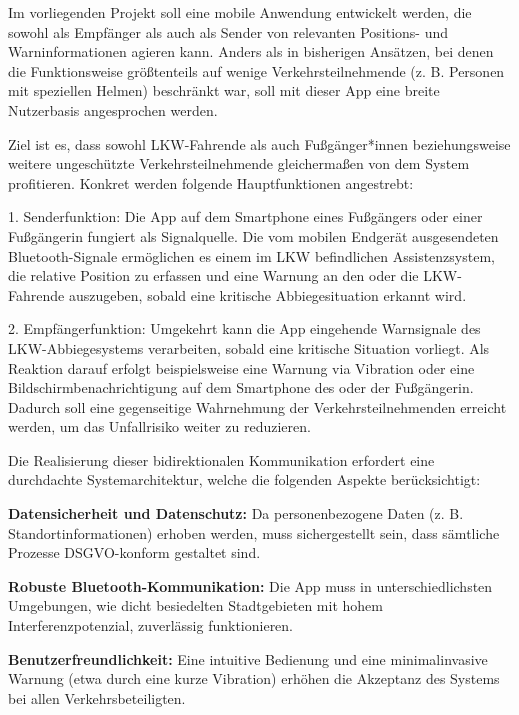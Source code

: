 \documentclass[a4paper, 12pt]{article} %
\begin{document}
\begin{spacing}{1.8}  %
\fontsize{14pt}{15pt}\selectfont  %

 
Im vorliegenden Projekt soll eine mobile Anwendung entwickelt werden, die sowohl als Empfänger als auch als Sender von relevanten Positions- und Warninformationen agieren kann. Anders als in bisherigen Ansätzen, bei denen die Funktionsweise größtenteils auf wenige Verkehrsteilnehmende (z. B. Personen mit speziellen Helmen) beschränkt war, soll mit dieser App eine breite Nutzerbasis angesprochen werden.  

Ziel ist es, dass sowohl LKW-Fahrende als auch Fußgänger*innen beziehungsweise weitere ungeschützte Verkehrsteilnehmende gleichermaßen von dem System profitieren. Konkret werden folgende Hauptfunktionen angestrebt:

1. Senderfunktion: 
   Die App auf dem Smartphone eines Fußgängers oder einer Fußgängerin fungiert als Signalquelle. Die vom mobilen Endgerät ausgesendeten Bluetooth-Signale ermöglichen es einem im LKW befindlichen Assistenzsystem, die relative Position zu erfassen und eine Warnung an den oder die LKW-Fahrende auszugeben, sobald eine kritische Abbiegesituation erkannt wird.

2. Empfängerfunktion:  
   Umgekehrt kann die App eingehende Warnsignale des LKW-Abbiegesystems verarbeiten, sobald eine kritische Situation vorliegt. Als Reaktion darauf erfolgt beispielsweise eine Warnung via Vibration oder eine Bildschirmbenachrichtigung auf dem Smartphone des oder der Fußgänger\*in. Dadurch soll eine gegenseitige Wahrnehmung der Verkehrsteilnehmenden erreicht werden, um das Unfallrisiko weiter zu reduzieren.

Die Realisierung dieser bidirektionalen Kommunikation erfordert eine durchdachte Systemarchitektur, welche die folgenden Aspekte berücksichtigt:

\textbf{Datensicherheit und Datenschutz:}  Da personenbezogene Daten (z. B. Standortinformationen) erhoben werden, muss sichergestellt sein, dass sämtliche Prozesse DSGVO-konform gestaltet sind.  

\textbf{Robuste Bluetooth-Kommunikation:}  Die App muss in unterschiedlichsten Umgebungen, wie dicht besiedelten Stadtgebieten mit hohem Interferenzpotenzial, zuverlässig funktionieren.  

\textbf{Benutzerfreundlichkeit:}  Eine intuitive Bedienung und eine minimalinvasive Warnung (etwa durch eine kurze Vibration) erhöhen die Akzeptanz des Systems bei allen Verkehrsbeteiligten.  


\end{spacing}
\end{document}
